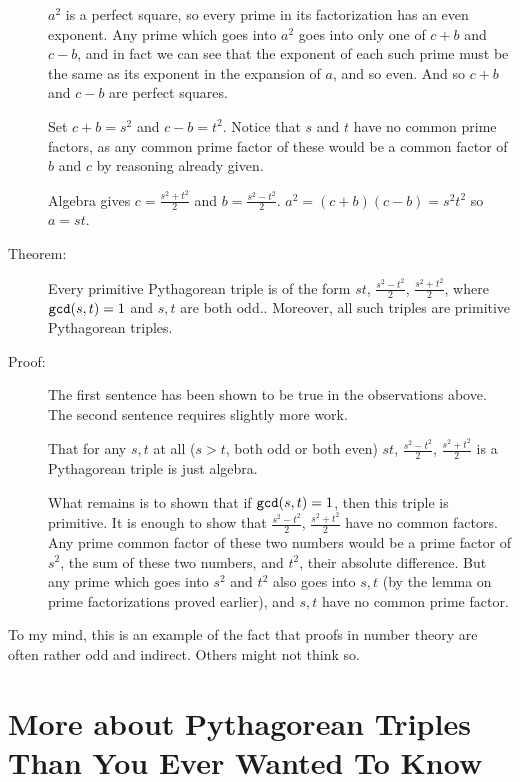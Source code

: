 \documentclass[12pt]{article}
\begin{document}
\begin{description}
$a^2$ is a perfect square, so every prime in its factorization has an even exponent.  Any prime which goes
into $a^2$ goes into only one of $c+b$ and $c-b$, and in fact we can see that the exponent of each such prime must be the same as its exponent in the expansion of $a$, and so even.  And so $c+b$ and $c-b$ are perfect squares.

Set $c+b = s^2$ and $c-b=t^2$.   Notice that $s$ and $t$ have no common prime factors, as any common prime factor of these would be a common factor of $b$ and $c$ by reasoning already given.

Algebra gives $c=\frac{s^2+t^2}2$ and $b=\frac{s^2-t^2}2$.  $a^2=(c+b)(c-b)=s^2t^2$ so $a=st$.

\item[Theorem:]   Every primitive Pythagorean triple is of the form $st$, $\frac{s^2-t^2}2$, $\frac{s^2+t^2}2$,
where ${\tt gcd}(s,t)=1$ and $s,t$ are both odd..   Moreover, all such triples are primitive Pythagorean triples.

\item[Proof:]   The first sentence has been shown to be true in the observations above.  The second sentence
requires slightly more work.

That for any $s,t$ at all  ($s>t$, both odd or both even) $st$, $\frac{s^2-t^2}2$, $\frac{s^2+t^2}2$ is a Pythagorean triple is just algebra.

What remains is to shown that if ${\tt gcd}(s,t)=1$, then this triple is primitive.   It is enough to show
that $\frac{s^2-t^2}2$, $\frac{s^2+t^2}2$ have no common factors.   Any prime common factor of these two
numbers would be a prime factor of $s^2$, the sum of these two numbers, and $t^2$, their absolute difference.
But any prime which goes into $s^2$ and $t^2$ also goes into $s,t$ (by the lemma on prime factorizations proved earlier), and $s,t$ have no common prime factor.

\end{description}

To my mind, this is an example of the fact that proofs in number theory are often rather odd and indirect.  Others might not think so.






\section{More about Pythagorean Triples Than You Ever Wanted To Know}
\end{document}
